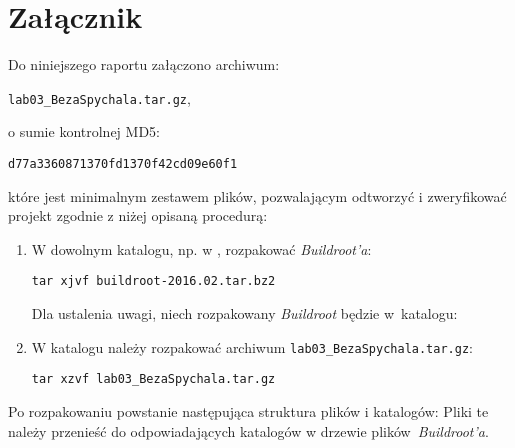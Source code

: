 \documentclass{article}
\newcommand{\labnumber}{3}
\begin{document}

\section{Załącznik}

Do niniejszego raportu załączono archiwum:
\begin{center}
\texttt{lab0\labnumber\_BezaSpychala.tar.gz},
\end{center}
o sumie kontrolnej MD5:
\begin{center}
\texttt{d77a3360871370fd1370f42cd09e60f1}
\end{center}
które jest minimalnym zestawem plików, pozwalającym odtworzyć i zweryfikować projekt zgodnie z niżej opisaną procedurą:
\begin{enumerate}
\item W dowolnym katalogu, np. w , rozpakować \emph{Buildroot'a}:
\begin{center}
\texttt{tar xjvf buildroot-2016.02.tar.bz2}
\end{center}

Dla ustalenia uwagi, niech rozpakowany \emph{Buildroot} będzie w~katalogu:
\begin{center}
\end{center}

\item W katalogu  należy rozpakować archiwum \texttt{lab0\labnumber\_BezaSpychala.tar.gz}:
\begin{center}
\texttt{tar xzvf lab0\labnumber\_BezaSpychala.tar.gz}
\end{center}
\end{enumerate}

Po rozpakowaniu powstanie następująca struktura plików i katalogów:
Pliki te należy przenieść do odpowiadających katalogów w drzewie plików~\emph{Buildroot'a}.




\end{document}
